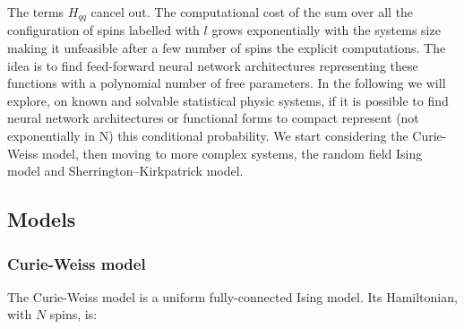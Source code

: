 \documentclass{article}
\begin{document}
The terms $H_{qq}$ cancel out.
The computational cost of the sum over all the configuration of spins labelled with $l$ grows exponentially with the systems size making it unfeasible after a few number of spins the explicit computations. The idea is to find feed-forward neural network architectures representing these functions with a polynomial number of free parameters.   
In the following we will explore, on known and solvable statistical physic systems, if it is possible to find neural network architectures or functional forms to compact represent (not exponentially in N) this conditional probability. We start considering the Curie-Weiss model, then moving to more complex systems, the random field Ising model and Sherrington–Kirkpatrick model.

\subsection{Models}
\subsubsection{Curie-Weiss model}

The Curie-Weiss model is a uniform fully-connected Ising model. Its Hamiltonian, with $N$ spins, is:
\end{document}
